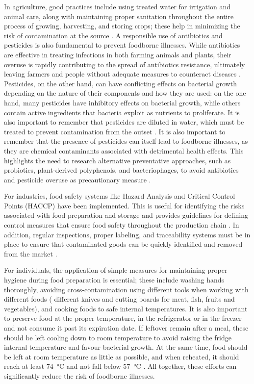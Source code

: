 In agriculture, good practices include using treated water for irrigation and
animal care, along with maintaining proper sanitation throughout the entire
process of growing, harvesting, and storing crops; these help in minimizing the
risk of contamination at the source \citep{faoAssuring2003}. A responsible use
of antibiotics and pesticides is also fundamental to prevent foodborne
illnesses. While antibiotics are effective in treating infections in both
farming animals and plants, their overuse is rapidly contributing to the spread
of antibiotics resistance, ultimately leaving farmers and people without
adequate measures to counteract diseases \citep{canicaAntibiotic2019}. 
Pesticides, on the other hand, can have conflicting effects on bacterial growth
depending on the nature of their components and how they are used: on the one
hand, many pesticides have inhibitory effects on bacterial growth, while others
contain active ingredients that bacteria exploit as nutrients to proliferate. It
is also important to remember that pesticides are diluted in water, which must
be treated to prevent contamination from the outset \citep{dobhalSurvival2014}.
It is also important to remember that the presence of pesticides can itself lead
to foodborne illnesses, as they are chemical contaminants associated with
detrimental health effects. This highlights the need to research alternative
preventative approaches, such as probiotics, plant-derived polyphenols, and
bacteriophages, to avoid antibiotics and pesticide overuse as precautionary
measure \citep{friedmanAntibioticResistant2015,maAntimicrobial2019}.

For industries, food safety systems like Hazard Analysis and Critical Control
Points (HACCP) have been implemented. This is useful for identifying the risks
associated with food preparation and storage and provides guidelines for
defining control measures that ensure food safety throughout the production
chain \citep{faowhoFAO2006,wallaceHACCP2014}. In addition, regular inspections,
proper labeling, and traceability systems must be in place to ensure that
contaminated goods can be quickly identified and removed from the market
\citep{programFood2024,ISO2018}.

For individuals, the application of simple measures for maintaining proper
hygiene during food preparation is essential; these include washing hands
thoroughly, avoiding cross-contamination using different tools when working with
different foods (\eg{} different knives and cutting boards for meat, fish,
fruits and vegetables), and cooking foods to safe internal temperatures. It is
also important to preserve food at the proper temperature, \eg{} in the
refrigerator or in the freezer and not consume it past its expiration date. If
leftover remain after a meal, these should be left cooling down to room
temperature to avoid raising the fridge internal temperature and favour
bacterial growth. At the same time, food should be left at room temperature as
little as possible, and when reheated, it should reach at least
\SI{74}{\degreeCelsius} and not fall below \SI{57}{\degreeCelsius}
\citep{whoFive2006,cdcFour2024,efsaHandling}. All together, these efforts can
significantly reduce the risk of foodborne illnesses.

